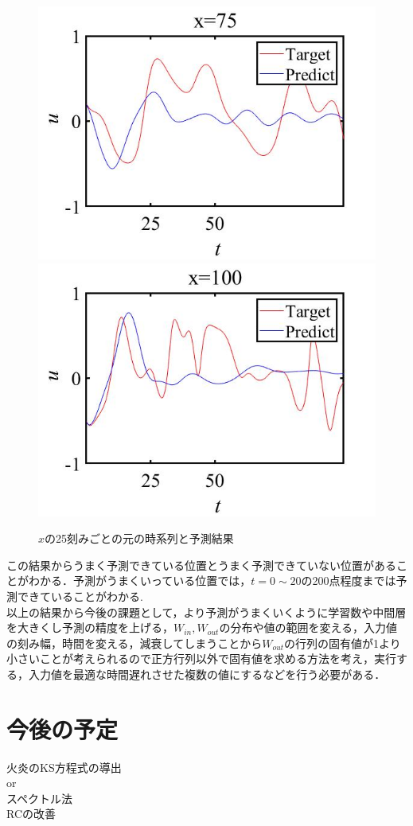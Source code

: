 \documentclass[autodetect-engine,dvipdfmx-if-dvi,ja=standard,a4paper,11pt]{bxjsarticle} %
\begin{document}
\begin{figure}[H]
\begin{center}
\includegraphics[width=.3\textwidth]{x=75.jpg}
\includegraphics[width=.3\textwidth]{x=100.jpg}
\end{center}
\caption{$x$の25刻みごとの元の時系列と予測結果}%
\label{fig:x25}
\end{figure}
この結果からうまく予測できている位置とうまく予測できていない位置があることがわかる．予測がうまくいっている位置では，$t=0\sim20$の200点程度までは予測できていることがわかる.\\
\　以上の結果から今後の課題として，より予測がうまくいくように学習数や中間層を大きくし予測の精度を上げる，$W_{in},W_{out}$の分布や値の範囲を変える，入力値の刻み幅，時間を変える，減衰してしまうことから$W_{out}$の行列の固有値が1より小さいことが考えられるので正方行列以外で固有値を求める方法を考え，実行する，入力値を最適な時間遅れさせた複数の値にするなどを行う必要がある．

\newpage
\section{今後の予定}
火炎のKS方程式の導出\\
\　or\\
\　スペクトル法\\
\　RCの改善



\end{document}
